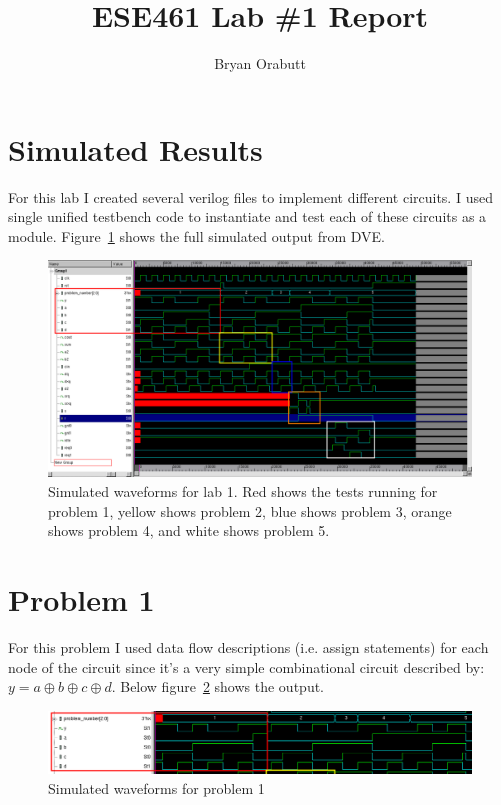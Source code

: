 \documentclass[fullpage]{article}
\title{ESE461 Lab \#1 Report}
\author{Bryan Orabutt}
\begin{document}
\maketitle

\section*{Simulated Results}
For this lab I created several verilog files to implement different circuits. I used single unified testbench code to instantiate and test each of these circuits as a module. Figure~\ref{fig:results} shows the full simulated output from DVE.

\begin{figure}[ht!]
 	\includegraphics[scale=0.45,keepaspectratio=true]{../images/lab1.png}
 	\caption{Simulated waveforms for lab 1. Red shows the tests running for problem 1, yellow shows problem 2, blue shows problem 3, orange shows problem 4, and white shows problem 5.}
 	\label{fig:results}
\end{figure}

\section*{Problem 1}

For this problem I used data flow descriptions (i.e. assign statements) for each node of the circuit since it's a very simple combinational circuit described by: $y = a \oplus b \oplus c \oplus d$. Below figure~\ref{fig:p1} shows the output.

\begin{figure}[ht!]
 	\includegraphics[scale=0.5,keepaspectratio=true]{../images/prob1.png}
 	\caption{Simulated waveforms for problem 1}
 	\label{fig:p1}
\end{figure}
\end{document}
